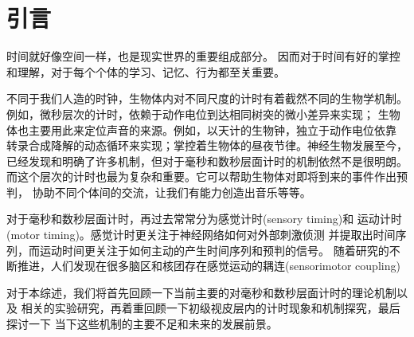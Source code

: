 \section{引言}
时间就好像空间一样，也是现实世界的重要组成部分。
因而对于时间有好的掌控和理解，对于每个个体的学习、记忆、行为都至关重要。

不同于我们人造的时钟，生物体内对不同尺度的计时有着截然不同的生物学机制。
例如，微秒层次的计时，依赖于动作电位到达相同树突的微小差异来实现；
生物体也主要用此来定位声音的来源。例如，以天计的生物钟，独立于动作电位依靠
转录合成降解的动态循环来实现；掌控着生物体的昼夜节律。神经生物发展至今，
已经发现和明确了许多机制，但对于毫秒和数秒层面计时的机制依然不是很明朗。
而这个层次的计时也最为复杂和重要。它可以帮助生物体对即将到来的事件作出预判，
协助不同个体间的交流，让我们有能力创造出音乐等等。

对于毫秒和数秒层面计时，再过去常常分为感觉计时(sensory timing)和
运动计时(motor timing)。感觉计时更关注于神经网络如何对外部刺激侦测
并提取出时间序列，而运动时间更关注于如何主动的产生时间序列和预判的信号。
随着研究的不断推进，人们发现在很多脑区和核团存在感觉运动的耦连(sensorimotor coupling)


对于本综述，我们将首先回顾一下当前主要的对毫秒和数秒层面计时的理论机制以及
相关的实验研究，再着重回顾一下初级视皮层内的计时现象和机制探究，最后探讨一下
当下这些机制的主要不足和未来的发展前景。
